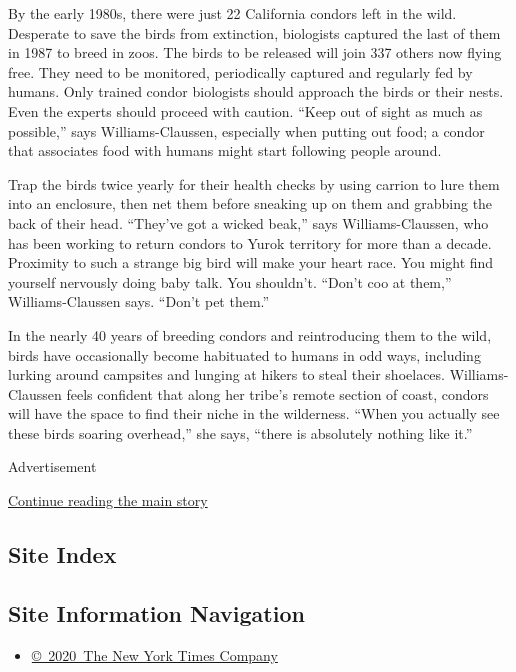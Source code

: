 By the early 1980s, there were just 22 California condors left in the
wild. Desperate to save the birds from extinction, biologists captured
the last of them in 1987 to breed in zoos. The birds to be released will
join 337 others now flying free. They need to be monitored, periodically
captured and regularly fed by humans. Only trained condor biologists
should approach the birds or their nests. Even the experts should
proceed with caution. ``Keep out of sight as much as possible,'' says
Williams-Claussen, especially when putting out food; a condor that
associates food with humans might start following people around.

Trap the birds twice yearly for their health checks by using carrion to
lure them into an enclosure, then net them before sneaking up on them
and grabbing the back of their head. ``They've got a wicked beak,'' says
Williams-Claussen, who has been working to return condors to Yurok
territory for more than a decade. Proximity to such a strange big bird
will make your heart race. You might find yourself nervously doing baby
talk. You shouldn't. ``Don't coo at them,'' Williams-Claussen says.
``Don't pet them.''

In the nearly 40 years of breeding condors and reintroducing them to the
wild, birds have occasionally become habituated to humans in odd ways,
including lurking around campsites and lunging at hikers to steal their
shoelaces. Williams-Claussen feels confident that along her tribe's
remote section of coast, condors will have the space to find their niche
in the wilderness. ``When you actually see these birds soaring
overhead,'' she says, ``there is absolutely nothing like it.''

Advertisement

\protect\hyperlink{after-bottom}{Continue reading the main story}

\hypertarget{site-index}{%
\subsection{Site Index}\label{site-index}}

\hypertarget{site-information-navigation}{%
\subsection{Site Information
Navigation}\label{site-information-navigation}}

\begin{itemize}
\tightlist
\item
  \href{https://help.nytimes.com/hc/en-us/articles/115014792127-Copyright-notice}{©~2020~The
  New York Times Company}
\end{itemize}

